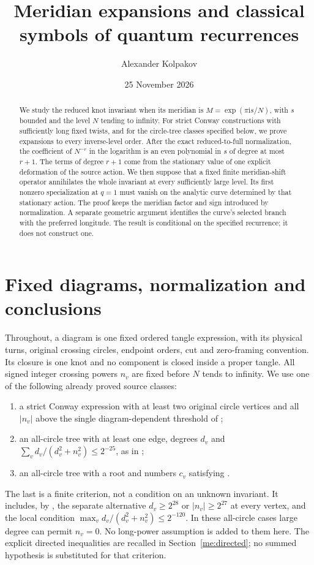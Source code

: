\documentclass[11pt]{article}
\title{Meridian expansions and classical symbols of quantum recurrences}
\author{Alexander Kolpakov}\date{25 November 2026}
\numberwithin{equation}{section}
\theoremstyle{definition}\newtheorem{definition}[theorem]{Definition}
\newcommand{\ii}{\mathrm i}
\begin{document}
\maketitle
\begin{abstract}
We study the reduced knot invariant when its meridian is
$M=\exp(\pi\ii s/N)$, with $s$ bounded and the level $N$ tending
to infinity. For strict Conway constructions with sufficiently long
fixed twists, and for the circle-tree classes specified below, we
prove expansions to every inverse-level order. After the exact
reduced-to-full normalization, the coefficient of $N^{-r}$ in the
logarithm is an even polynomial in $s$ of degree at most $r+1$.
The terms of degree $r+1$ come from the stationary value of one
explicit deformation of the source action. We then suppose that a
fixed finite meridian-shift operator annihilates the whole invariant
at every sufficiently large level. Its first nonzero specialization
at $q=1$ must vanish on the analytic curve determined by that stationary
action. The proof keeps the meridian factor and sign introduced by
normalization. A separate geometric argument identifies the curve's
selected branch with the preferred longitude. The result is conditional
on the specified recurrence; it does not construct one.
\end{abstract}

\section{Fixed diagrams, normalization and conclusions}\label{me:intro}
Throughout, a diagram is one fixed ordered tangle expression,
with its physical turns, original crossing circles, endpoint orders,
cut and zero-framing convention. Its closure is one knot and no
component is closed inside a proper tangle. All signed integer
crossing powers $n_v$ are fixed before $N$ tends to infinity. We use
one of the following already proved source classes:
\begin{enumerate}
\item a strict Conway expression with at least two original circle
vertices and all $|n_v|$ above the single diagram-dependent threshold
of \cite[Theorem 1.2]{MovingSources};
\item an all-circle tree with at least one edge, degrees $d_v$ and
$\sum_v d_v/(d_v^2+n_v^2)\le2^{-25}$, as in
\cite[Theorems 1.1--1.2]{CircleTree};
\item an all-circle tree with a root and numbers $c_v$ satisfying
\cite[equations (7.3), (7.8), (7.9), Theorem 1.3]{CircleTree}.
\end{enumerate}
The last is a finite criterion, not a condition on an unknown
invariant. It includes, by \cite[Corollary 1.4]{CircleTree}, the
separate alternative $d_v\ge2^{28}$ or $|n_v|\ge2^{27}$ at every
vertex, and the local condition
$\max_v d_v/(d_v^2+n_v^2)\le2^{-120}$. In these all-circle cases
large degree can permit $n_v=0$. No long-power assumption is added
to them here. The explicit directed inequalities are recalled in
Section~\ref{me:directed}; no summed hypothesis is substituted for
that criterion.
\end{document}
